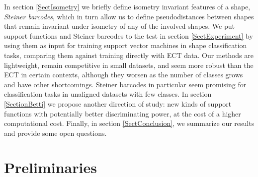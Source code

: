 \documentclass[a4paper]{article}
\begin{document}
In section \ref{SectIsometry} we briefly define isometry invariant features of a shape, \emph{Steiner barcodes}, which in turn allow us to define pseudodistances between shapes that remain invariant under isometry of any of the involved shapes. We put support functions and Steiner barcodes to the test in section \ref{SectExperiment} by using them as input for training support vector machines in shape classification tasks, comparing them against training directly with ECT data. Our methods are lightweight, remain competitive in small datasets, and seem more robust than the ECT in certain contexts, although they worsen as the number of classes grows and have other shortcomings. Steiner barcodes in particular seem promising for classification tasks in unaligned datasets with few classes. In section \ref{SectionBetti} we propose another direction of study: new kinds of support functions with potentially better discriminating power, at the cost of a higher computational cost. Finally, in section \ref{SectConclusion}, we summarize our results and provide some open questions.

	
\section{Preliminaries}
\label{SectPre}
\end{document}
